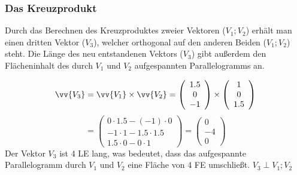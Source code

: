 \documentclass[a4paper, 15pt]{article}
\begin{document}
\subsubsection{Das Kreuzprodukt}
Durch das Berechnen des Kreuzproduktes zweier Vektoren ($V_1; V_2$) erhält man einen dritten Vektor ($V_3$), welcher orthogonal auf den anderen Beiden ($V_1; V_2$) steht. Die Länge des neu entstandenen Vektors ($V_3$) gibt außerdem den Flächeninhalt des durch $V_1$ und $V_2$ aufgespannten Parallelogramms an.\newline\newline
\begin{minipage}{.49\textwidth}
\begin{equation*}
\vv{V_3} = \vv{V_1} \times \vv{V_2} = \left(\begin{array}{c} 1.5 \\ 0 \\ -1 \end{array}\right) \times \left(\begin{array}{c} 1 \\ 0 \\ 1.5 \end{array}\right)
\end{equation*}
\begin{equation*}
= \left(\begin{array}{c} 0\cdot1.5-(-1)\cdot0 \\ -1\cdot1-1.5\cdot1.5 \\ 1.5\cdot0-0\cdot1 \end{array}\right) = \left(\begin{array}{c} 0 \\ -4 \\ 0 \end{array}\right)
\end{equation*}\newline\newline
Der Vektor $V_3$ ist 4 LE lang, was bedeutet, dass das aufgespannte Parallelogramm durch $V_1$ und $V_2$ eine Fläche von 4 FE umschließt. $V_3 \perp V_1; V_2$ 
\end{minipage}
\begin{minipage}{.49\textwidth}
\flushright
\begin{center}
\end{center}
\end{minipage}\newline
\end{document}
